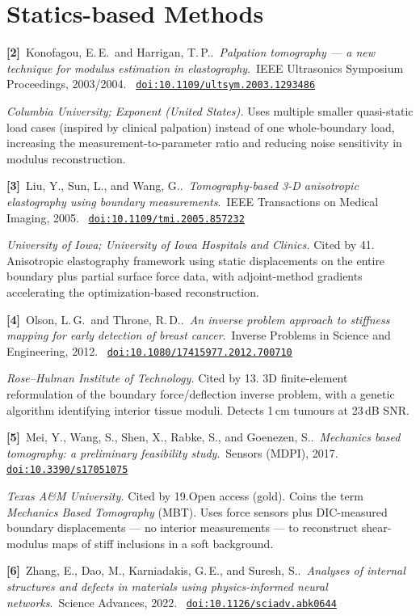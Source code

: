 \documentclass[11pt]{article}
\newcommand{\bibentry}[6]{%
  \noindent\textbf{[#1]}~#2.~\textit{#3}.~#4, #5.~%
  \href{https://doi.org/#6}{\texttt{doi:#6}}\par\vspace{6pt}
}
\begin{document}
\section{Statics-based Methods}

\bibentry{2}{Konofagou, E.\,E.\ and Harrigan, T.\,P.}{Palpation tomography --- a new technique for modulus estimation in elastography}{IEEE Ultrasonics Symposium Proceedings}{2003/2004}{10.1109/ultsym.2003.1293486}

\textit{Columbia University; Exponent (United States).} \quad
Uses multiple smaller quasi-static load cases (inspired by clinical palpation) instead of one whole-boundary load, increasing the measurement-to-parameter ratio and reducing noise sensitivity in modulus reconstruction.

\bibentry{3}{Liu, Y., Sun, L., and Wang, G.}{Tomography-based 3-D anisotropic elastography using boundary measurements}{IEEE Transactions on Medical Imaging}{2005}{10.1109/tmi.2005.857232}

\textit{University of Iowa; University of Iowa Hospitals and Clinics.} Cited by 41. \quad
Anisotropic elastography framework using static displacements on the entire boundary plus partial surface force data, with adjoint-method gradients accelerating the optimization-based reconstruction.

\bibentry{4}{Olson, L.\,G.\ and Throne, R.\,D.}{An inverse problem approach to stiffness mapping for early detection of breast cancer}{Inverse Problems in Science and Engineering}{2012}{10.1080/17415977.2012.700710}

\textit{Rose--Hulman Institute of Technology.} Cited by 13. \quad
3D finite-element reformulation of the boundary force/deflection inverse problem, with a genetic algorithm identifying interior tissue moduli. Detects 1\,cm tumours at 23\,dB SNR.

\bibentry{5}{Mei, Y., Wang, S., Shen, X., Rabke, S., and Goenezen, S.}{Mechanics based tomography: a preliminary feasibility study}{Sensors (MDPI)}{2017}{10.3390/s17051075}

\textit{Texas A\&M University.} Cited by 19.\quad Open access (gold). \quad
Coins the term \emph{Mechanics Based Tomography} (MBT). Uses force sensors plus DIC-measured boundary displacements --- no interior measurements --- to reconstruct shear-modulus maps of stiff inclusions in a soft background.

\bibentry{6}{Zhang, E., Dao, M., Karniadakis, G.\,E., and Suresh, S.}{Analyses of internal structures and defects in materials using physics-informed neural networks}{Science Advances}{2022}{10.1126/sciadv.abk0644}
\end{document}
